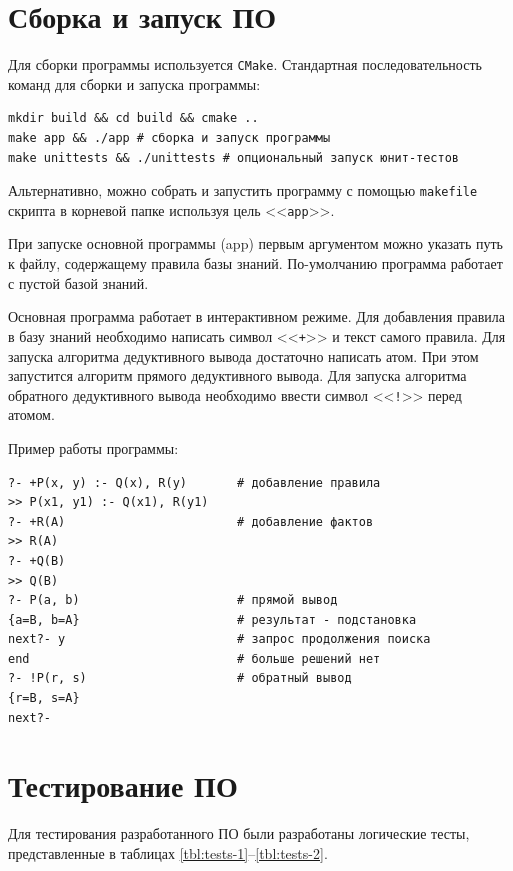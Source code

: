 \section{Сборка и запуск ПО}

Для сборки программы используется \texttt{CMake}. Стандартная последовательность команд для сборки и запуска программы:

\begin{verbatim}
mkdir build && cd build && cmake ..
make app && ./app # сборка и запуск программы
make unittests && ./unittests # опциональный запуск юнит-тестов
\end{verbatim}

Альтернативно, можно собрать и запустить программу с помощью \texttt{makefile} скрипта в корневой папке используя цель <<\texttt{app}>>.

При запуске основной программы (app) первым аргументом можно указать путь к файлу, содержащему правила базы знаний. По-умолчанию программа работает с пустой базой знаний.

Основная программа работает в интерактивном режиме. Для добавления правила в базу знаний необходимо написать символ <<\texttt{+}>> и текст самого правила. Для запуска алгоритма дедуктивного вывода достаточно написать атом. При этом запустится алгоритм прямого дедуктивного вывода. Для запуска алгоритма обратного дедуктивного вывода необходимо ввести символ <<\texttt{!}>> перед атомом.

Пример работы программы:
\begin{verbatim}
?- +P(x, y) :- Q(x), R(y)       # добавление правила
>> P(x1, y1) :- Q(x1), R(y1)
?- +R(A)                        # добавление фактов
>> R(A)
?- +Q(B)
>> Q(B)
?- P(a, b)                      # прямой вывод
{a=B, b=A}                      # результат - подстановка
next?- y                        # запрос продолжения поиска
end                             # больше решений нет
?- !P(r, s)                     # обратный вывод
{r=B, s=A}
next?-
\end{verbatim}

\section{Тестирование ПО}

Для тестирования разработанного ПО были разработаны логические тесты, представленные в таблицах \ref{tbl:tests-1}--\ref{tbl:tests-2}.

